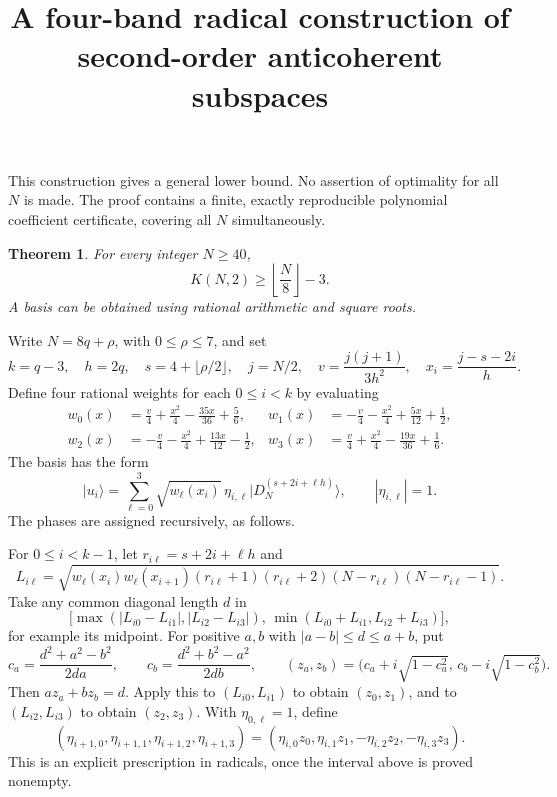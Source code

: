 \documentclass[11pt]{article}
\newtheorem{theorem}{Theorem}
\newcommand{\ket}[1]{\lvert #1\rangle}
\begin{document}
\title{A four-band radical construction of second-order anticoherent subspaces}
\author{}\date{}\maketitle

This construction gives a general lower bound.  No assertion of optimality
for all $N$ is made.  The proof contains a finite, exactly reproducible
polynomial coefficient certificate, covering all $N$ simultaneously.

\begin{theorem}
For every integer $N\ge40$,
\[
 K(N,2)\ge\left\lfloor\frac N8\right\rfloor-3.
\]
A basis can be obtained using rational arithmetic and square roots.
\end{theorem}

Write $N=8q+\rho$, with $0\le\rho\le7$, and set
\[
 k=q-3,\quad h=2q,\quad s=4+\lfloor\rho/2\rfloor,\quad
 j=N/2,\quad v=\frac{j(j+1)}{3h^2},\quad x_i=\frac{j-s-2i}{h}.
\]
Define four rational weights for each $0\le i<k$ by evaluating
\begin{align*}
 w_0(x)&=\frac v4+\frac{x^2}4-\frac{35x}{36}+\frac56,&
 w_1(x)&=-\frac v4-\frac{x^2}4+\frac{5x}{12}+\frac12,\\
 w_2(x)&=-\frac v4-\frac{x^2}4+\frac{13x}{12}-\frac12,&
 w_3(x)&=\frac v4+\frac{x^2}4-\frac{19x}{36}+\frac16.
\end{align*}
The basis has the form
\[
 \ket{u_i}=\sum_{\ell=0}^3
 \sqrt{w_\ell(x_i)}\,\eta_{i,\ell}
 \ket{D_N^{(s+2i+\ell h)}},\qquad |\eta_{i,\ell}|=1.
\]
The phases are assigned recursively, as follows.

For $0\le i<k-1$, let $r_{i\ell}=s+2i+\ell h$ and
\[
 L_{i\ell}=\sqrt{w_\ell(x_i)w_\ell(x_{i+1})
 (r_{i\ell}+1)(r_{i\ell}+2)(N-r_{i\ell})(N-r_{i\ell}-1)}.
\]
Take any common diagonal length $d$ in
\[
 \bigl[\max(|L_{i0}-L_{i1}|,|L_{i2}-L_{i3}|),\,
       \min(L_{i0}+L_{i1},L_{i2}+L_{i3})\bigr],
\]
for example its midpoint.  For positive $a,b$ with $|a-b|\le d\le a+b$,
put
\[
 c_a=\frac{d^2+a^2-b^2}{2da},\qquad
 c_b=\frac{d^2+b^2-a^2}{2db},\qquad
 (z_a,z_b)=\bigl(c_a+i\sqrt{1-c_a^2},\,
                   c_b-i\sqrt{1-c_b^2}\bigr).
\]
Then $az_a+bz_b=d$.  Apply this to $(L_{i0},L_{i1})$ to obtain
$(z_0,z_1)$, and to $(L_{i2},L_{i3})$ to obtain $(z_2,z_3)$.
With $\eta_{0,\ell}=1$, define
\[
 (\eta_{i+1,0},\eta_{i+1,1},\eta_{i+1,2},\eta_{i+1,3})
 =(\eta_{i,0}z_0,\eta_{i,1}z_1,-\eta_{i,2}z_2,-\eta_{i,3}z_3).
\]
This is an explicit prescription in radicals, once the interval above is
proved nonempty.
\end{document}

